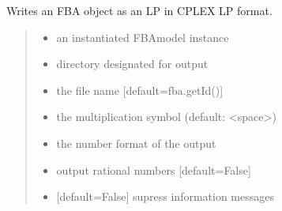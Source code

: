 \documentclass[letterpaper,12pt,english]{sphinxmanual}
\begin{document}
\begin{fulllineitems}

\pysigstartsignatures
\pysiglinewithargsret
{}
{\sphinxparamcomma {}\sphinxparamcomma {}\sphinxparamcomma {}\sphinxparamcomma {}\sphinxparamcomma {}\sphinxparamcomma {}\sphinxparamcomma {}}
{}
\pysigstopsignatures
\sphinxAtStartPar
Writes an FBA object as an LP in CPLEX LP format.
\begin{quote}\begin{description}
\begin{itemize}
\item {} 
\sphinxAtStartPar
{} \textendash{} an instantiated FBAmodel instance

\item {} 
\sphinxAtStartPar
{} \textendash{} directory designated for output

\item {} 
\sphinxAtStartPar
{} \textendash{} the file name {[}default=fba.getId(){]}

\item {} 
\sphinxAtStartPar
{} \textendash{} the multiplication symbol (default: \textless{}space\textgreater{})

\item {} 
\sphinxAtStartPar
{} \textendash{} the number format of the output

\item {} 
\sphinxAtStartPar
{} \textendash{} output rational numbers {[}default=False{]}

\item {} 
\sphinxAtStartPar
{} \textendash{} {[}default=False{]} supress information messages

\end{itemize}

\end{description}\end{quote}

\end{fulllineitems}
\end{document}

